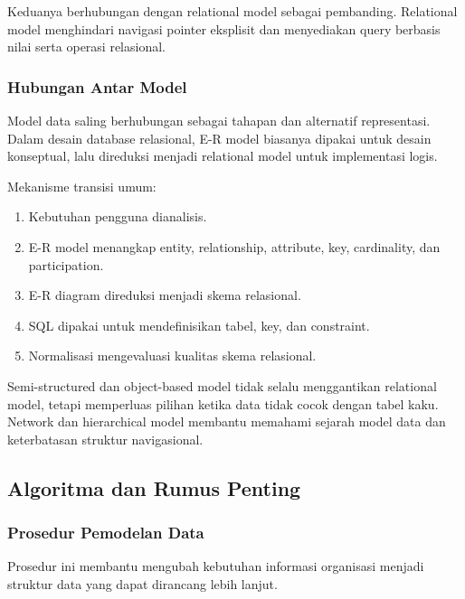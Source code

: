 Keduanya berhubungan dengan relational model sebagai pembanding. Relational model menghindari navigasi pointer eksplisit dan menyediakan query berbasis nilai serta operasi relasional.

\subsubsection{Hubungan Antar Model}

\begin{jawab}
Model data saling berhubungan sebagai tahapan dan alternatif representasi. Dalam desain database relasional, E-R model biasanya dipakai untuk desain konseptual, lalu direduksi menjadi relational model untuk implementasi logis.
\end{jawab}

Mekanisme transisi umum:
\begin{enumerate}
    \item Kebutuhan pengguna dianalisis.
    \item E-R model menangkap entity, relationship, attribute, key, cardinality, dan participation.
    \item E-R diagram direduksi menjadi skema relasional.
    \item SQL dipakai untuk mendefinisikan tabel, key, dan constraint.
    \item Normalisasi mengevaluasi kualitas skema relasional.
\end{enumerate}

Semi-structured dan object-based model tidak selalu menggantikan relational model, tetapi memperluas pilihan ketika data tidak cocok dengan tabel kaku. Network dan hierarchical model membantu memahami sejarah model data dan keterbatasan struktur navigasional.

\subsection{Algoritma dan Rumus Penting}

\subsubsection{Prosedur Pemodelan Data}

\begin{jawab}
Prosedur ini membantu mengubah kebutuhan informasi organisasi menjadi struktur data yang dapat dirancang lebih lanjut.
\end{jawab}


